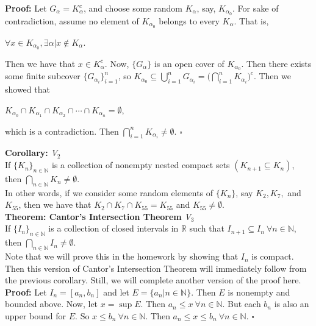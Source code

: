 \documentclass{article}
\begin{document}
\textbf{Proof:} Let $G_{\alpha} = K_{\alpha}^c$, and choose some random $K_{\alpha}$, say, $K_{\alpha_0}$. For sake of contradiction, assume no element of $K_{\alpha_0}$ belongs to every $K_{\alpha}$. That is, 
\begin{center}
    $\forall x \in K_{\alpha_0}, \exists \alpha \big| x \notin K_{\alpha}$.
\end{center}
Then we have that $x \in K_{\alpha}^c$. Now, $\{G_{\alpha}\}$ is an open cover of $K_{\alpha_0}$. Then there exists some finite subcover $\{G_{\alpha_i}\}_{i = 1}^n$, so $K_{\alpha_0} \subseteq \bigcup_{i = 1}^n G_{\alpha_i} = \bigl( \bigcap_{i=1}^n K_{\alpha_i} \bigr)^c$. Then we showed that
\begin{center}
    $K_{\alpha_0} \cap K_{\alpha_1} \cap K_{\alpha_2} \cap \cdots \cap K_{\alpha_n} = \emptyset$,
\end{center}
which is a contradiction. Then $\bigcap_{i = 1}^n K_{\alpha_i} \neq \emptyset$. $\square$

\textbf{Corollary:} \textit{V$_2$}\\
If $\{K_n\}_{n \in \mathbb{N}}$ is a collection of nonempty nested compact sets $(K_{n+1} \subseteq K_n)$, then $\bigcap_{n \in \mathbb{N}} K_n \neq \emptyset$. \\

In other words, if we consider some random elements of $\{K_n\}$, say $K_2, K_7,$ and $K_{55}$, then we have that $K_2 \cap K_7 \cap K_{55} = K_{55}$ and $K_{55} \neq \emptyset$.\\

\textbf{Theorem: Cantor's Intersection Theorem} \textit{V$_3$}\\
If $\{I_n\}_{n \in \mathbb{N}}$ is a collection of closed intervals in $\mathbb{R}$ such that $I_{n+1} \subseteq I_n \ \forall n \in \mathbb{N}$, then $\bigcap_{n \in \mathbb{N}} I_n \neq \emptyset$.\\

Note that we will prove this in the homework by showing that $I_n$ is compact. Then this version of Cantor's Intersection Theorem will immediately follow from the previous corollary. Still, we will complete another version of the proof here.\\

\textbf{Proof:} Let $I_n = [a_n,b_n]$ and let $E = \{a_n \big|n \in \mathbb{N}\}$. Then $E$ is nonempty and bounded above. Now, let $x=\sup{E}$. Then $a_n \leq x \ \forall n \in \mathbb{N}$. But each $b_n$ is also an upper bound for $E$. So $x \leq b_n \ \forall n \in \mathbb{N}$. Then $a_n \leq x \leq b_n \ \forall n \in \mathbb{N}$. $\square$ \\
\end{document}
